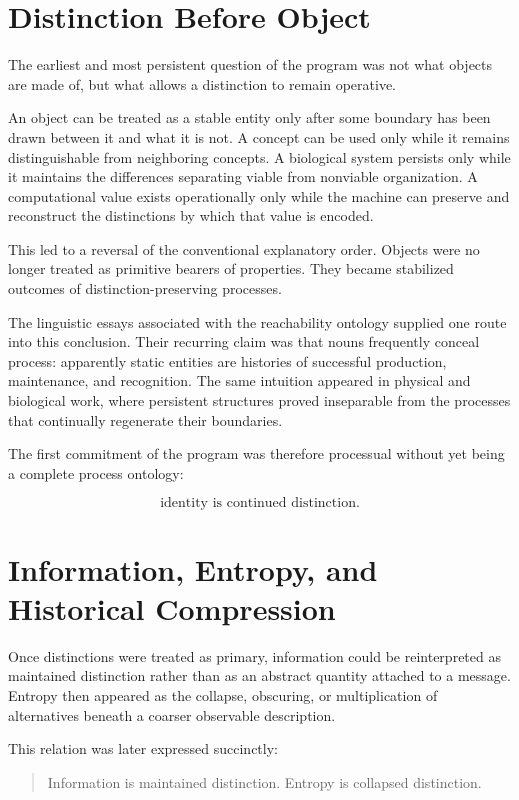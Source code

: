 \documentclass[11pt,oneside]{book}
\numberwithin{equation}{chapter}
\theoremstyle{definition}
\theoremstyle{plain}
\begin{document}
\section{Distinction Before Object}

The earliest and most persistent question of the program was not what
objects are made of, but what allows a distinction to remain operative.

An object can be treated as a stable entity only after some boundary has
been drawn between it and what it is not. A concept can be used only while
it remains distinguishable from neighboring concepts. A biological system
persists only while it maintains the differences separating viable from
nonviable organization. A computational value exists operationally only
while the machine can preserve and reconstruct the distinctions by which
that value is encoded.

This led to a reversal of the conventional explanatory order. Objects were
no longer treated as primitive bearers of properties. They became
stabilized outcomes of distinction-preserving processes.

The linguistic essays associated with the reachability ontology supplied one
route into this conclusion. Their recurring claim was that nouns frequently
conceal process: apparently static entities are histories of successful
production, maintenance, and recognition. The same intuition appeared in
physical and biological work, where persistent structures proved
inseparable from the processes that continually regenerate their
boundaries.

The first commitment of the program was therefore processual without yet
being a complete process ontology:

\[
\text{identity is continued distinction}.
\]

\section{Information, Entropy, and Historical Compression}

Once distinctions were treated as primary, information could be
reinterpreted as maintained distinction rather than as an abstract quantity
attached to a message. Entropy then appeared as the collapse, obscuring, or
multiplication of alternatives beneath a coarser observable description.

This relation was later expressed succinctly:

\begin{quote}
Information is maintained distinction. Entropy is collapsed distinction.
\end{quote}
\end{document}
